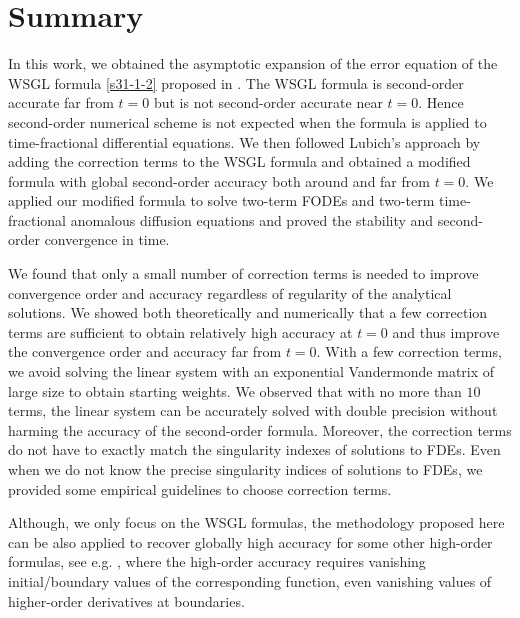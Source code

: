 \documentclass[10pt]{siamltex}
\begin{document}
\section{Summary}\label{concl}


In this work, we obtained the asymptotic expansion of the error equation of the
WSGL formula \eqref{s31-1-2} proposed in \cite{TianZD14}. The WSGL formula is second-order accurate far from $t=0$  but is not second-order accurate  near $t=0$. Hence  second-order numerical scheme is not expected when the formula is
applied to   time-fractional differential equations.
%
We then followed Lubich's approach  by adding the correction terms
to the  WSGL formula  and obtained a modified formula
with global second-order accuracy  both around and far from $t=0$.
%
We  applied our modified formula   to solve  two-term
FODEs and   two-term time-fractional anomalous diffusion equations
and proved the stability and second-order convergence in time.

We found that only a small number of correction terms  is  needed to improve
convergence order and accuracy regardless of regularity of the analytical solutions. We showed both theoretically and numerically that
a few correction terms are sufficient to obtain  relatively high accuracy at $t=0$ and
thus improve the convergence order and accuracy far from $t=0$.  With a few correction terms, we avoid solving the   linear system  with an exponential Vandermonde matrix of large size to obtain starting weights. We observed that with no more than $10$ terms, the linear system can be accurately solved with double precision without harming the accuracy of the second-order formula. Moreover, the correction terms do not have to  exactly match
the singularity indexes of solutions to FDEs. Even when we do not know the precise singularity indices of solutions to FDEs, we provided some empirical guidelines to choose correction terms.




Although, we only focus on the  WSGL formulas,
the methodology proposed here can be also applied to recover  globally high accuracy for some other  high-order formulas, see e.g.
\cite{CelikDuman12,ChenDeng14,DingLC14a,DingLC14b,GaoSS15,ZengLLT13,ZhaoSH14,ZhouTD13}, where the high-order accuracy requires
vanishing initial/boundary values of the corresponding function, even   vanishing values of  higher-order derivatives at boundaries.
\end{document}
